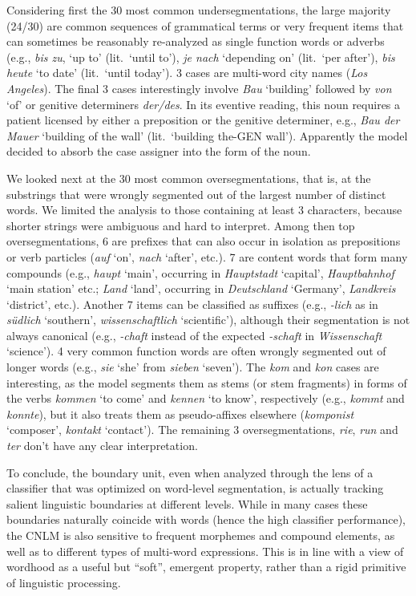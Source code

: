 Considering first the 30 most common undersegmentations, the large
majority (24/30) are common sequences of grammatical terms or very
frequent items that can sometimes be reasonably re-analyzed as
single function words or adverbs (e.g., \emph{bis zu}, `up to'
(lit.~`until to'), \emph{je nach} `depending on' (lit.~`per after'),
\emph{bis heute} `to date' (lit.~`until today'). 3 cases are
multi-word city names (\emph{Los Angeles}). The final 3 cases
interestingly involve \emph{Bau} `building' followed by \emph{von}
`of' or genitive determiners \emph{der/des}. In its eventive reading,
this noun requires a patient licensed by either a preposition or the
genitive determiner, e.g., \emph{Bau der Mauer} `building of the wall'
(lit.~`building the-GEN wall'). Apparently the model decided to absorb
the case assigner into the form of the noun.

We looked next at the 30 most common oversegmentations, that is, at the
 substrings that were wrongly segmented out of the largest
number of distinct words. We limited the analysis to those containing
at least 3 characters, because shorter strings were ambiguous and
hard to interpret. Among then top oversegmentations, 6 are prefixes that can also occur in
isolation as prepositions or verb particles (\emph{auf} `on',
\emph{nach} `after', etc.). 7 are content words that form many
compounds (e.g., \emph{haupt} `main', occurring in \emph{Hauptstadt}
`capital', \emph{Hauptbahnhof} `main station' etc.; \emph{Land}
`land', occurring in \emph{Deutschland} `Germany', \emph{Landkreis}
`district', etc.). Another 7 items can be classified as suffixes
(e.g., \emph{-lich} as in \emph{s\"udlich} `southern',
\emph{wissenschaftlich} `scientific'), although their segmentation is
not always canonical (e.g., \emph{-chaft} instead of the expected
\emph{-schaft} in \emph{Wissenschaft} `science'). 4 very common
function words are often wrongly segmented out of longer words (e.g.,
\emph{sie} `she' from \emph{sieben} `seven'). The \emph{kom} and
\emph{kon} cases are interesting, as the model
 segments them as stems (or stem fragments) in forms of the verbs \emph{kommen} `to
come' and \emph{kennen} `to know', respectively (e.g., \emph{kommt}
and \emph{konnte}), but it also treats them as pseudo-affixes elsewhere
(\emph{komponist} `composer', \emph{kontakt} `contact'). The remaining
3 oversegmentations, \emph{rie}, \emph{run} and \emph{ter} don't have
any clear interpretation.

To conclude, the boundary unit, even when
analyzed through the lens of a classifier that was optimized on
word-level segmentation, is actually tracking salient linguistic
boundaries at different levels. While in many cases these boundaries
naturally coincide with words (hence the high classifier performance),
the CNLM is also sensitive to frequent morphemes and compound
elements, as well as to different types of multi-word
expressions. This is in line with a view of wordhood as a useful but
``soft'', emergent property, rather than a rigid primitive of
linguistic processing.

